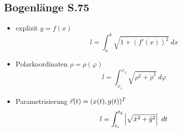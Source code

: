 \subsection{Bogenlänge \texorpdfstring{\hfill S.75}{S.75}}
    \begin{itemize}
        \item explizit $y = f(x)$
            $$
                l = \int_a^b \sqrt{1 + \left( f'(x) \right)^2} \ dx
            $$
        \item Polarkoordinaten $\rho = \rho(\varphi)$
            $$
                l = \int_{\varphi_1}^{\varphi_2} \sqrt{\rho^2 + \dot{\rho}^2} \ d\varphi
            $$
        \item Parametrisierung $\vec{r}(t) = (x(t),y(t))^T$
            $$
                l = \int_{t_1}^{t_2} \left\lvert \sqrt{\dot{x}^2 + \dot{y}^2} \right\rvert \ dt
            $$
    \end{itemize}
